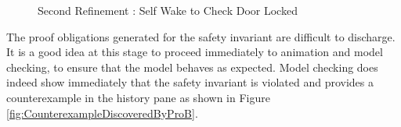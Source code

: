 \begin{figure}[!htbp]
  
  \caption{Second Refinement : Self Wake to Check Door Locked}
  \label{fig:SecondRefinementSelfWakeToCheckDoorLocked}
\end{figure} 

The proof obligations generated for the safety invariant are difficult to discharge. It is a good idea at this stage to proceed immediately to animation and model checking, to ensure that the model behaves as expected.
Model checking does indeed show immediately that the safety invariant is violated and provides a counterexample in the history pane as shown in Figure \ref{fig:CounterexampleDiscoveredByProB}.
 
